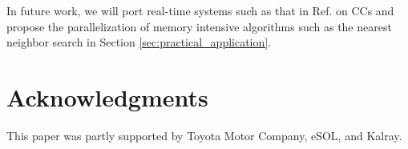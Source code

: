 \documentclass[conference,compsoc]{IEEEtran}
\newcommand{\comment}[1]{}
\begin{document}
In future work, we will port real-time systems such as that in Ref. \cite{maruyama2016ros2} on CCs and propose the parallelization of memory intensive algorithms such as the nearest neighbor search in Section \ref{sec:practical_application}.
\vspace{-3mm}
\section*{Acknowledgments}
\vspace{-3mm}
This paper was partly supported by Toyota Motor Company, eSOL, and Kalray.

% 
% 

\renewcommand{\baselinestretch}{0.8}

\comment{2-5}
\comment{TBD: 3-6}
\vspace{-1mm}

\end{document}
